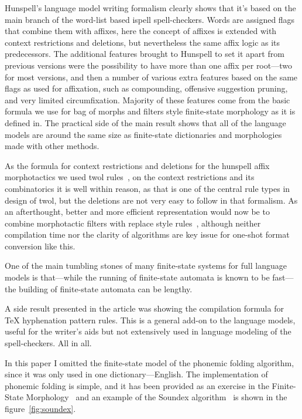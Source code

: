 \documentclass[officiallayout,draft]{unihelcompling}
\begin{document}
Hunspell's language model writing formalism clearly shows that it's based on
the main branch of the word-list based ispell spell-checkers. Words are
assigned flags that combine them with affixes, here the concept of affixes
is extended with context restrictions and deletions, but nevertheless the
same affix logic as its predecessors. The additional features brought to
Hunspell to set it apart from previous versions were the possibility to have
more than one affix per root---two for most versions, and then a number of
various extra features based on the same flags as used for affixation, such
as compounding, offensive suggestion pruning, and very limited circumfixation.
Majority of these features come from the basic formula we use for bag of
morphs and filters style finite-state morphology as it is defined
in\cite{hfst2010}. The practical side of the main result shows that all of
the language models are around the same size as finite-state dictionaries and
morphologies made with other methods.

As the formula for context restrictions and deletions for the hunspell affix
morphotactics we used twol rules~\cite{karttunen1988?}, on the context
restrictions and its combinatorics it is well within reason, as that is one
of the central rule types in design of twol, but the deletions are not very
easy to follow in that formalism. As an afterthought, better and more efficient
representation would now be to combine morphotactic filters with replace
style rules~\cite{karttunen1995replace}, although neither compilation time
nor the clarity of algorithms are key issue for one-shot format conversion
like this.

One of the main tumbling stones of many finite-state systems for full language
models is that---while the running of finite-state automata is known to be
fast---the building of finite-state automata can be lengthy. 

A side result presented in the article was showing the compilation formula
for \TeX{} hyphenation pattern rules. This is a general add-on to the language
models, useful for the writer's aids but not extensively used in language
modeling of the spell-checkers. All in all.

In this paper I omitted the finite-state model of the phonemic folding
algorithm, since it was only used in one dictionary---English. The
implementation of phonemic folding is simple, and it has been provided as an
exercise in the Finite-State Morphology~\cite{beesley2003finite} and an example
of the Soundex algorithm~\cite{russell1918soundex} is shown in the
figure~\ref{fig:soundex}.
\end{document}
